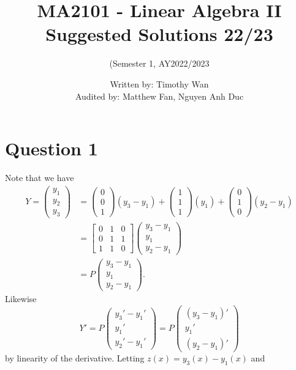 \documentclass[12pt]{article}
\title{MA2101 - Linear Algebra II Suggested Solutions 22/23}
\author{(Semester 1, AY2022/2023}
\date{Written by: Timothy Wan\\Audited by: Matthew Fan, Nguyen Anh Duc}
\begin{document}
\maketitle

\section*{Question 1}
Note that we have
\begin{align*}
Y
=\begin{pmatrix} y_1\\y_2\\y_3 \end{pmatrix}
&=\begin{pmatrix} 0\\0\\1 \end{pmatrix}(y_3-y_1)
+\begin{pmatrix} 1\\1\\1 \end{pmatrix}(y_1)
+\begin{pmatrix} 0\\1\\0 \end{pmatrix}(y_2-y_1)
\\&=\begin{bmatrix} 0&1&0\\0&1&1\\1&1&0 \end{bmatrix}
\begin{pmatrix} y_3-y_1\\y_1\\y_2-y_1 \end{pmatrix} 
\\&=P
\begin{pmatrix} y_3-y_1\\y_1\\y_2-y_1 \end{pmatrix} 
.
\end{align*}
Likewise 
\[
    Y'
=P\begin{pmatrix} y_3'-y_1'\\y_1'\\y_2'-y_1' \end{pmatrix} 
=P\begin{pmatrix} (y_3-y_1)'\\y_1'\\(y_2-y_1)' \end{pmatrix} 
\]
by linearity of the derivative. Letting $z(x)=y_3(x)-y_1(x)$ and
\end{document}
